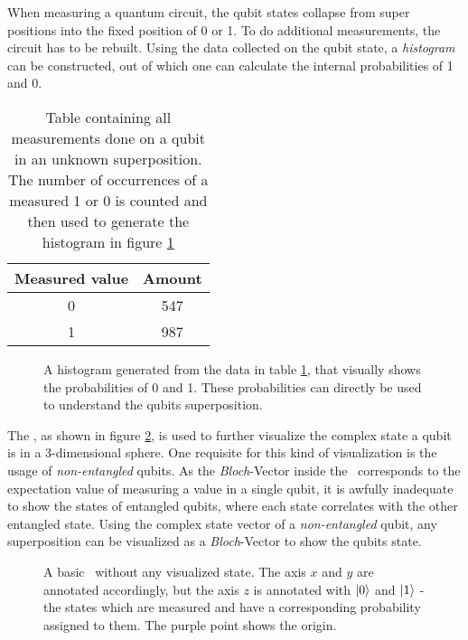 When measuring a quantum circuit, the qubit states collapse from super positions into the fixed position of 0 or 1. To do additional measurements, the circuit has to be rebuilt. Using the data collected on the qubit state, a \emph{histogram} can be constructed, out of which one can calculate the internal probabilities of 1 and 0.

\begin{table}[!h]
    \centering
    \begin{tabular}{|c|c|}
         Measured value & Amount  \\
         \hline
         0 & 547 \\
         1 & 987 \\
    \end{tabular}
    \caption{Table containing all measurements done on a qubit in an unknown superposition. The number of occurrences of a measured 1 or 0 is counted and then used to generate the histogram in figure \ref{figure:example_histogram}}
    \label{table:example_counts}
\end{table}


\begin{figure}[!h]
    \centering
    \scalebox{\histogramwidth}{
        
    }
    \caption{A histogram generated from the data in table \ref{table:example_counts}, that visually shows the probabilities of 0 and 1. These probabilities can directly be used to understand the qubits superposition.}
    \label{figure:example_histogram}
\end{figure}

\newpage

The \bloch\cite{michael_a_nielsen_quantum_2000}, as shown in figure \ref{figure:basic_bloch_sphere}, is used to further visualize the complex state a qubit is in a 3-dimensional sphere. One requisite for this kind of visualization is the usage of \emph{non-entangled} qubits. As the \emph{Bloch}-Vector inside the \bloch\ corresponds to the expectation value of measuring a value in a single qubit, it is awfully inadequate to show the states of entangled qubits, where each state correlates with the other entangled state. Using the complex state vector of a \emph{non-entangled} qubit, any superposition can be visualized as a \emph{Bloch}-Vector to show the qubits state.

\begin{figure}[!h]
    \centering
    \scalebox{\blochwidth}{
        
    }
    \caption{A basic \bloch\ without any visualized state. The axis $x$ and $y$ are annotated accordingly, but the axis $z$ is annotated with $\ket{0}$ and $\ket{1}$ - the states which are measured and have a corresponding probability assigned to them. The purple point shows the origin.}
    \label{figure:basic_bloch_sphere}
\end{figure}

